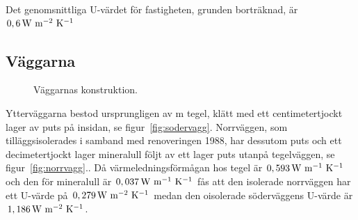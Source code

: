 Det genomsnittliga U-värdet för fastigheten, grunden borträknad, är $\unit[0,6]{W~m^{-2}~K^{-1}}$

\subsection{Väggarna}
\label{subsec:walls}

\begin{figure}[hpbt]
\centering
{}

\caption{\label{fig:thewalls} Väggarnas konstruktion.}
\end{figure}

Ytterväggarna bestod ursprungligen av \unit[0,5]{m} tegel, klätt med ett centimetertjockt lager av puts på insidan,
se figur~\ref{fig:sodervagg}. Norrväggen, som tilläggsisolerades i samband med renoveringen 1988, har dessutom puts och ett decimetertjockt lager mineralull följt av ett lager puts utanpå tegelväggen,
se figur~\ref{fig:norrvagg}.\cite{kandidatarbete2010}\cite{petersarneo}. Då värmeledningsförmågan hos tegel är
$\unit[0,593]{W~m^{-1}~K^{-1}}$ och den för mineralull är $\unit[0,037]{W~m^{-1}~K^{-1}}$
fås att den isolerade norrväggen har ett U-värde på $\unit[0,279]{W~m^{-2}~K^{-1}}$
medan den oisolerade söderväggens U-värde är $\unit[1,186]{W~m^{-2}~K^{-1}}$.


